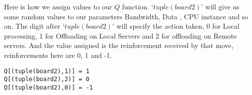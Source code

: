 \documentclass[12pt]{report}
\begin{document}
Here is how we assign values to our $Q$ function. `$tuple(board2)$' will give us some random values to our parameters Bandwidth, Data , CPU instance and so on. The digit after `$tuple(board2)$' will specify the action taken, 0 for Local processing, 1 for Offloading on Local Servers and 2 for offloading on Remote servers. And the value assigned is the reinforcement received by that move, reinforcements here are 0, 1 and -1.

\begin{small}
\begin{lstlisting}
Q[(tuple(board2),1)] = 1
Q[(tuple(board2),2)] = 0
Q[(tuple(board2),0)] = -1
\end{lstlisting}
\end{small}

\begin{comment} 
After sufficient trials of different combinations of these parameters and assigning suitable reinforcement values now we have our $Q$ function trained. Now just to test it we will give a random choice of parameters and see the reinforcement values for this combination and decide what should be the best action. 

Following are the Figures~\ref{fig:RL_Local}, \ref{fig:RL_offload_Local}, and \ref{fig:RL_offload_Remote} where three different instances with suitable different actions each time.    
            
\begin{figure}[h!]
  \centering
  \texttt{[image: "GIMP Images/RL\_Local".png]}
  \caption{Best Action: Local Processing}
  \label{fig:RL_Local}
\end{figure}
\begin{figure}[h!]
  \centering
  \texttt{[image: "GIMP Images/RL\_offload\_Local".png]}
  \caption{Best Action: Offload on Local servers, Second best action: Offload on remote Server}
  \label{fig:RL_offload_Local}
\end{figure}
\begin{figure}[h!]
  \centering
  \texttt{[image: "GIMP Images/RL\_offload\_Remote".png]}
  \caption{Best Action: Offload on Remote servers, Second best action: Offload on Local Server}
  \label{fig:RL_offload_Remote}
\end{figure}
\end{comment}
\end{document}
